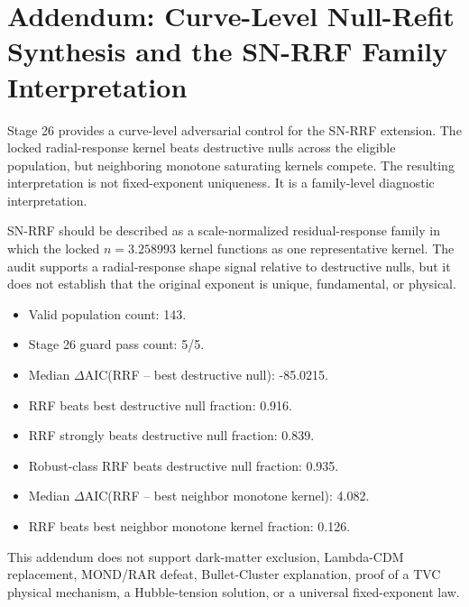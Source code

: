 \section*{Addendum: Curve-Level Null-Refit Synthesis and the SN-RRF Family Interpretation}

Stage 26 provides a curve-level adversarial control for the SN-RRF extension. The locked radial-response kernel beats destructive nulls across the eligible population, but neighboring monotone saturating kernels compete. The resulting interpretation is not fixed-exponent uniqueness. It is a family-level diagnostic interpretation.

SN-RRF should be described as a scale-normalized residual-response family in which the locked $n=3.258993$ kernel functions as one representative kernel. The audit supports a radial-response shape signal relative to destructive nulls, but it does not establish that the original exponent is unique, fundamental, or physical.

\begin{itemize}
\item Valid population count: 143.
\item Stage 26 guard pass count: 5/5.
\item Median $\Delta\mathrm{AIC}$(RRF -- best destructive null): -85.0215.
\item RRF beats best destructive null fraction: 0.916.
\item RRF strongly beats destructive null fraction: 0.839.
\item Robust-class RRF beats destructive null fraction: 0.935.
\item Median $\Delta\mathrm{AIC}$(RRF -- best neighbor monotone kernel): 4.082.
\item RRF beats best neighbor monotone kernel fraction: 0.126.
\end{itemize}

This addendum does not support dark-matter exclusion, Lambda-CDM replacement, MOND/RAR defeat, Bullet-Cluster explanation, proof of a TVC physical mechanism, a Hubble-tension solution, or a universal fixed-exponent law.
